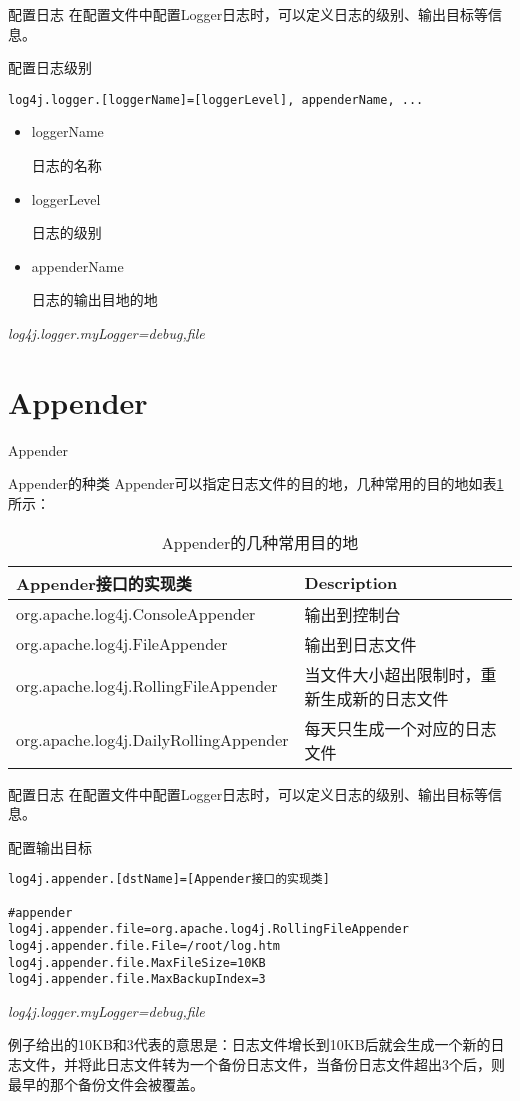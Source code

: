 \documentclass{beamer}
\begin{document}
\begin{frame}[fragile]{配置日志}
在配置文件中配置Logger日志时，可以定义日志的级别、输出目标等信息。
\begin{block}{配置日志级别}
\begin{verbatim}
log4j.logger.[loggerName]=[loggerLevel], appenderName, ...
\end{verbatim}
\begin{itemize}
\item
loggerName

日志的名称
\item
loggerLevel

日志的级别
\item
appenderName

日志的输出目地的地
\end{itemize}
\emph{log4j.logger.myLogger=debug,file}
\end{block}

\end{frame}

\section{Appender}
\begin{frame}
\Huge{\centerline{Appender}}
\end{frame}
\begin{frame}{Appender的种类}
Appender可以指定日志文件的目的地，几种常用的目的地如表\ref{appender}所示：
\begin{table}
\begin{tabular}{lp{12em}}
\toprule
\textbf{Appender接口的实现类}&\textbf{Description}\\
\midrule
org.apache.log4j.ConsoleAppender&输出到控制台\\
org.apache.log4j.FileAppender&输出到日志文件\\
org.apache.log4j.RollingFileAppender&当文件大小超出限制时，重新生成新的日志文件\\
org.apache.log4j.DailyRollingAppender&每天只生成一个对应的日志文件\\
\bottomrule
\end{tabular}
\caption{Appender的几种常用目的地}
\label{appender}
\end{table}
\end{frame}

\begin{frame}[fragile]{配置日志}
在配置文件中配置Logger日志时，可以定义日志的级别、输出目标等信息。
\begin{block}{配置输出目标}
\begin{verbatim}
log4j.appender.[dstName]=[Appender接口的实现类]

#appender
log4j.appender.file=org.apache.log4j.RollingFileAppender
log4j.appender.file.File=/root/log.htm
log4j.appender.file.MaxFileSize=10KB
log4j.appender.file.MaxBackupIndex=3
\end{verbatim}
\emph{log4j.logger.myLogger=debug,file}
\end{block}
例子给出的10KB和3代表的意思是：日志文件增长到10KB后就会生成一个新的日志文件，并将此日志文件转为一个备份日志文件，当备份日志文件超出3个后，则最早的那个备份文件会被覆盖。
\end{frame}
\end{document}
